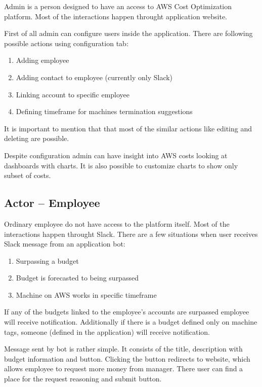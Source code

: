 \documentclass[licencjacka,en]{thesisclass}
\begin{document}
    Admin is a person designed to have an access to AWS Cost Optimization platform. Most of the interactions happen throught application website.

    First of all admin can configure users inside the application. There are following possible actions using configuration tab:

    \begin{enumerate}
        \item Adding employee
        \item Adding contact to employee (currently only Slack)
        \item Linking account to specific employee
        \item Defining timeframe for machines termination suggestions
    \end{enumerate}
    It is important to mention that that most of the similar actions like editing and deleting are possible.

    Despite configuration admin can have insight into AWS costs looking at dashboards with charts. It is also possible to customize charts to show only subset of costs.

    \subsection{Actor -- Employee}
    Ordinary employee do not have access to the platform itself. Most of the interactions happen throught Slack. There are a few situations when user receives Slack message from an application bot:

    \begin{enumerate}
        \item Surpassing a budget
        \item Budget is forecasted to being surpassed
        \item Machine on AWS works in specific timeframe
    \end{enumerate}

    If any of the budgets linked to the employee's accounts are surpassed employee will receive notification. Additionally if there is a budget defined only on machine tags, someone (defined in the application) will receive notification.

    Message sent by bot is rather simple. It consists of the title, description with budget information and button. Clicking the button redirects to website, which allows employee to request more money from manager. There user can find a place for the request reasoning and submit button.
\end{document}
